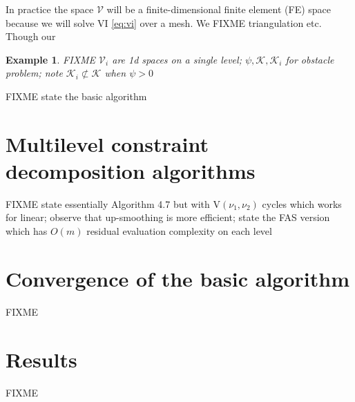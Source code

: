 \documentclass[letterpaper,final,12pt,reqno]{amsart}
\theoremstyle{cstyle}
\theoremstyle{dstyle}
\newtheorem{example}[theorem]{Example}
\numberwithin{equation}{section}
\numberwithin{figure}{section}
\numberwithin{table}{section}
\numberwithin{theorem}{section}
\newcommand{\cK}{\mathcal{K}}
\newcommand{\cV}{\mathcal{V}}
\begin{document}
In practice the space $\cV$ will be a finite-dimensional finite element (FE) space because we will solve VI \eqref{eq:vi} over a mesh.  We FIXME triangulation etc. Though our 

\begin{example}  FIXME $\cV_i$ are 1d spaces on a single level; $\psi,\cK,\cK_i$ for obstacle problem; note $\cK_i \not\subset \cK$ when $\psi>0$
\end{example}

FIXME state the basic algorithm


\section{Multilevel constraint decomposition algorithms} \label{sec:multilevel}

FIXME state essentially Algorithm 4.7 \cite{GraeserKornhuber2009} but with $\text{V}(\nu_1,\nu_2)$ cycles which works for linear; observe that up-smoothing is more efficient; state the FAS version which has $O(m)$ residual evaluation complexity on each level


\section{Convergence of the basic algorithm} \label{sec:convergence}

FIXME


\section{Results} \label{sec:results}

FIXME


\small

\bigskip


\end{document}
